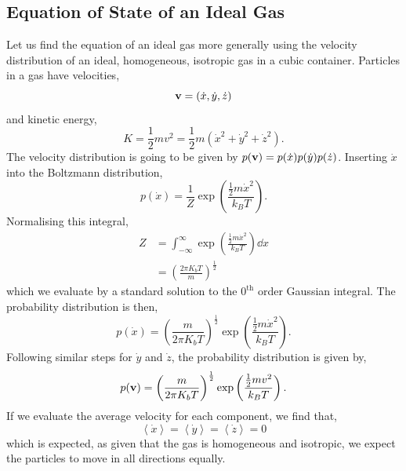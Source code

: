 \documentclass{book}
\begin{document}
\subsection{Equation of State of an Ideal Gas}
Let us find the equation of an ideal gas more generally using the velocity distribution of an ideal, homogeneous, isotropic gas in a cubic container. Particles in a gas have velocities,
\begin{equation}
	\vb{v} = \left(\Dot{x}, \Dot{y}, \Dot{z}\right) 
\end{equation}
and kinetic energy,
\begin{equation}
	K = \frac{1}{2}mv^2 = \frac{1}{2}m\left(\Dot{x}^2 + \Dot{y}^2 + \Dot{z}^2\right).
\end{equation}
The velocity distribution is going to be given by $p(\vb{v}) = p(\Dot{x})p(\Dot{y})p(\Dot{z})$. Inserting $\Dot{x}$ into the Boltzmann distribution,
\begin{equation}
	p(\Dot{x}) = \frac{1}{Z} \exp\left(\frac{\frac{1}{2}m\Dot{x}^2}{k_BT}\right).
\end{equation}
Normalising this integral,
\begin{equation}
	\begin{split}
	Z &= \int_{-\infty}^{\infty}\exp\left(\frac{\frac{1}{2}m\Dot{x}^2}{k_BT}\right) \dd{x}
	\\ & = \left(\frac{2\pi K_bT}{m}\right)^{\frac{1}{2}}
	\end{split}
\end{equation}
which we evaluate by a standard solution to the $0^{\text{th}}$ order Gaussian integral. The probability distribution is then,
\begin{equation}
	p(\Dot{x}) = \left(\frac{m}{2\pi K_bT}\right)^{\frac{1}{2}} \exp\left(\frac{\frac{1}{2}m\Dot{x}^2}{k_BT}\right).
\end{equation}
Following similar steps for $\Dot{y}$ and $\Dot{z}$, the probability distribution is given by,
\begin{equation}
	p(\vb{v}) = \left(\frac{m}{2\pi K_bT}\right)^{\frac{1}{2}} \exp\left(\frac{\frac{1}{2}mv^2}{k_BT}\right).
\end{equation}
If we evaluate the average velocity for each component, we find that,
\begin{equation}
	\left<\Dot{x}\right> = \left<\Dot{y}\right> = \left<\Dot{z}\right> = 0
\end{equation}
which is expected, as given that the gas is homogeneous and isotropic, we expect the particles to move in all directions equally.
\end{document}
